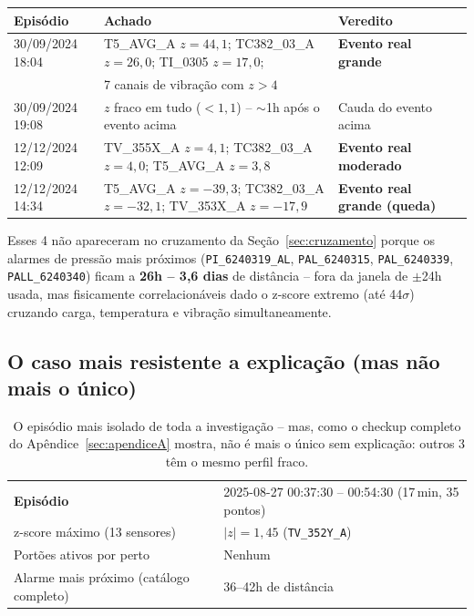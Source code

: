 \documentclass[11pt,a4paper]{article}
\begin{document}
\begin{table}[H]
\centering
\small
\begin{tabular}{llll}
\toprule
\textbf{Episódio} & \textbf{Achado} & \textbf{Veredito} \\
\midrule
30/09/2024 18:04 & T5\_AVG\_A $z=44,1$; TC382\_03\_A $z=26,0$; TI\_0305 $z=17,0$; & \textbf{Evento real grande} \\
& 7 canais de vibração com $z>4$ & \\
30/09/2024 19:08 & $z$ fraco em tudo ($<1,1$) -- $\sim$1h após o evento acima & Cauda do evento acima \\
12/12/2024 12:09 & TV\_355X\_A $z=4,1$; TC382\_03\_A $z=4,0$; T5\_AVG\_A $z=3,8$ & \textbf{Evento real moderado} \\
12/12/2024 14:34 & T5\_AVG\_A $z=-39,3$; TC382\_03\_A $z=-32,1$; TV\_353X\_A $z=-17,9$ & \textbf{Evento real grande (queda)} \\
\bottomrule
\end{tabular}
\end{table}

Esses 4 não apareceram no cruzamento da Seção~\ref{sec:cruzamento}
porque os alarmes de pressão mais próximos (\texttt{PI\_6240319\_AL},
\texttt{PAL\_6240315}, \texttt{PAL\_6240339}, \texttt{PALL\_6240340})
ficam a \textbf{26h -- 3,6 dias} de distância -- fora da janela de
$\pm$24h usada, mas fisicamente correlacionáveis dado o z-score
extremo (até 44$\sigma$) cruzando carga, temperatura e vibração
simultaneamente.

\subsection{O caso mais resistente a explicação (mas não mais o único)}

\begin{table}[H]
\centering
\small
\begin{tabular}{ll}
\toprule
\textbf{Episódio} & 2025-08-27 00:37:30 -- 00:54:30 (17\,min, 35 pontos) \\
z-score máximo (13 sensores) & $|z| = 1,45$ (\texttt{TV\_352Y\_A}) \\
Portões ativos por perto & Nenhum \\
Alarme mais próximo (catálogo completo) & 36--42h de distância \\
\bottomrule
\end{tabular}
\caption{O episódio mais isolado de toda a investigação -- mas, como
o checkup completo do Apêndice~\ref{sec:apendiceA} mostra, não é mais
o único sem explicação: outros 3 têm o mesmo perfil fraco.}
\end{table}
\end{document}
